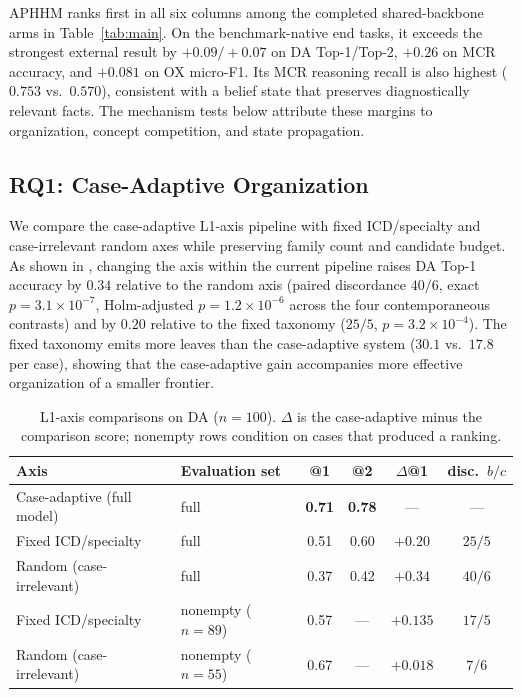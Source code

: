 \documentclass[letterpaper]{article} %
\begin{document}
APHHM ranks first in all six columns among the completed shared-backbone arms in Table~\ref{tab:main}.
On the benchmark-native end tasks, it exceeds the strongest external result by $+0.09/+0.07$ on DA Top-1/Top-2, $+0.26$ on MCR accuracy, and $+0.081$ on OX micro-F1.
Its MCR reasoning recall is also highest ($0.753$ vs.\ $0.570$), consistent with a belief state that preserves diagnostically relevant facts.
The mechanism tests below attribute these margins to organization, concept competition, and state propagation.

\subsection{RQ1: Case-Adaptive Organization}
\label{sec:res-org}

We compare the case-adaptive L1-axis pipeline with fixed ICD/specialty and case-irrelevant random axes while preserving family count and candidate budget.
As shown in , changing the axis within the current pipeline raises DA Top-1 accuracy by $0.34$ relative to the random axis (paired discordance $40/6$, exact $p=3.1{\times}10^{-7}$, Holm-adjusted $p=1.2{\times}10^{-6}$ across the four contemporaneous contrasts) and by $0.20$ relative to the fixed taxonomy ($25/5$, $p=3.2{\times}10^{-4}$).
The fixed taxonomy emits more leaves than the case-adaptive system ($30.1$ vs.\ $17.8$ per case), showing that the case-adaptive gain accompanies more effective organization of a smaller frontier.

\begin{table}[t]
\centering
\small
\begin{tabular}{llcccc}
\toprule
Axis & Evaluation set & @1 & @2 & $\Delta$@1 & disc.\ $b/c$ \\
\midrule
Case-adaptive (full model) & full & \textbf{0.71} & \textbf{0.78} & --- & --- \\
Fixed ICD/specialty & full & 0.51 & 0.60 & $+0.20$ & $25/5$ \\
Random (case-irrelevant) & full & 0.37 & 0.42 & $+0.34$ & $40/6$ \\
\midrule
Fixed ICD/specialty & nonempty ($n{=}89$) & 0.57 & --- & $+0.135$ & $17/5$ \\
Random (case-irrelevant) & nonempty ($n{=}55$) & 0.67 & --- & $+0.018$ & $7/6$ \\
\bottomrule
\end{tabular}
\caption{L1-axis comparisons on DA ($n{=}100$). $\Delta$ is the case-adaptive minus the comparison score; nonempty rows condition on cases that produced a ranking.}
\label{tab:org-axis}

\end{table}
\end{document}
